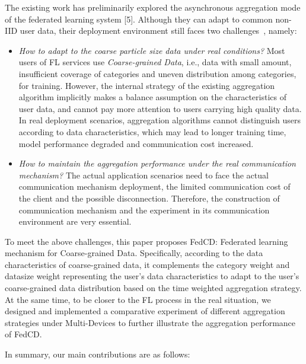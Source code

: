 \documentclass[twoside,twocolumn]{article}
\begin{document}
\begin{spacing}{1.0}
	The existing work has preliminarily explored the asynchronous aggregation mode of the federated learning system [5]. Although they can adapt to common non-IID user data, their deployment environment still faces two challenges~\cite{b18,b19,b20}, namely:
	\begin{itemize}
	\item \emph{How to adapt to the coarse particle size data under real conditions?}
	Most users of FL services use \emph{Coarse-grained Data}, i.e., data with small amount, insufficient coverage of categories and uneven distribution among categories, for training. However, the internal strategy of the existing aggregation algorithm implicitly makes a balance assumption on the characteristics of user data, and cannot pay more attention to users carrying high quality data. In real deployment scenarios, aggregation algorithms cannot distinguish users according to data characteristics, which may lead to longer training time, model performance degraded and communication cost increased.
	\item \emph{How to maintain the aggregation performance under the real communication mechanism?}
	The actual application scenarios need to face the actual communication mechanism deployment, the limited communication cost of the client and the possible disconnection. Therefore, the construction of communication mechanism and the experiment in its communication environment are very essential.
	\end{itemize}
	
	To meet the above challenges, this paper proposes FedCD: Federated learning mechanism for Coarse-grained Data. Specifically, according to the data characteristics of coarse-grained data,  it complements the category weight and datasize weight representing the user's data characteristics to adapt to the user's coarse-grained data distribution based on the time weighted aggregation strategy. At the same time, to be closer to the FL process in the real situation, we designed and implemented a comparative experiment of different aggregation strategies under Multi-Devices to further illustrate the aggregation performance of FedCD.
		
	In summary, our main contributions are as follows: 
	
	
	

\end{spacing}
\end{document}
